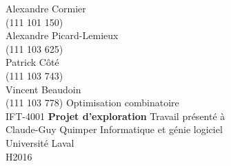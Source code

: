 \thispagestyle{empty}
\begin{center}
Alexandre Cormier\\
(111 101 150)\\
Alexandre Picard-Lemieux\\
(111 103 625)\\
Patrick Côté\\
(111 103 743)\\
Vincent Beaudoin\\
(111 103 778)
\vfill
Optimisation combinatoire\\
IFT-4001
\vfill
\textbf{Projet d'exploration}
\vfill
Travail présenté à\\
Claude-Guy Quimper
\vfill
Informatique et génie logiciel\\
Université Laval\\
H2016
\end{center}
